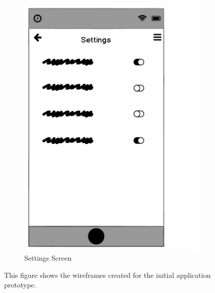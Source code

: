\documentclass{l4proj}
\begin{document}
\begin{figure}[htbp]
\begin{subfigure}[b]{0.45\textwidth}
        \includegraphics[width=\textwidth]{images/iteration_1_settings_screen_1.pdf}
        \caption{Settings Screen}
        \label{fig:settings_screen_1}
    \end{subfigure}   
    \caption{This figure shows the wireframes created for the initial application prototype.}\label{fig:initial_prototype_wireframes}
\end{figure}
\end{document}

